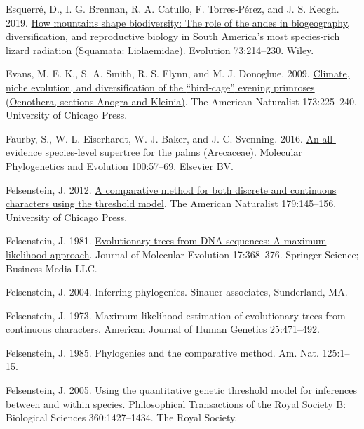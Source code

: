 \documentclass{article}
\newlength{\cslhangindent}
\newenvironment{CSLReferences}[2] %
 {\begin{list}{}{%
  \setlength{\itemindent}{0pt}
  \setlength{\leftmargin}{0pt}
  \setlength{\parsep}{0pt}
  \ifodd #1
   \setlength{\leftmargin}{\cslhangindent}
   \setlength{\itemindent}{-1\cslhangindent}
  \fi
  \setlength{\itemsep}{#2\baselineskip}}}
 {\end{list}}
\begin{document}
\begin{CSLReferences}{1}{0}
Esquerré, D., I. G. Brennan, R. A. Catullo, F. Torres‐Pérez, and J. S. Keogh. 2019. \href{https://doi.org/10.1111/evo.13657}{How mountains shape biodiversity: The role of the andes in biogeography, diversification, and reproductive biology in {S}outh {A}merica's most species‐rich lizard radiation ({S}quamata: {L}iolaemidae)}. Evolution 73:214--230. Wiley.

Evans, M. E. K., S. A. Smith, R. S. Flynn, and M. J. Donoghue. 2009. \href{https://doi.org/10.1086/595757}{Climate, niche evolution, and diversification of the {``bird‐cage''} evening primroses ({O}enothera, sections {A}nogra and {K}leinia)}. The American Naturalist 173:225--240. University of Chicago Press.

Faurby, S., W. L. Eiserhardt, W. J. Baker, and J.-C. Svenning. 2016. \href{https://doi.org/10.1016/j.ympev.2016.03.002}{An all-evidence species-level supertree for the palms ({A}recaceae)}. Molecular Phylogenetics and Evolution 100:57--69. Elsevier BV.

Felsenstein, J. 2012. \href{https://doi.org/10.1086/663681}{A comparative method for both discrete and continuous characters using the threshold model}. The American Naturalist 179:145--156. University of Chicago Press.

Felsenstein, J. 1981. \href{https://doi.org/10.1007/bf01734359}{Evolutionary trees from DNA sequences: A maximum likelihood approach}. Journal of Molecular Evolution 17:368--376. Springer Science; Business Media LLC.

Felsenstein, J. 2004. Inferring phylogenies. Sinauer associates, Sunderland, MA.

Felsenstein, J. 1973. Maximum-likelihood estimation of evolutionary trees from continuous characters. American Journal of Human Genetics 25:471--492.

Felsenstein, J. 1985. Phylogenies and the comparative method. Am. Nat. 125:1--15.

Felsenstein, J. 2005. \href{https://doi.org/10.1098/rstb.2005.1669}{Using the quantitative genetic threshold model for inferences between and within species}. Philosophical Transactions of the Royal Society B: Biological Sciences 360:1427--1434. The Royal Society.


\end{CSLReferences}
\end{document}
